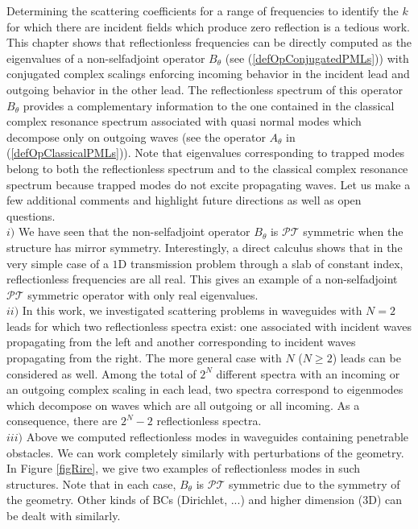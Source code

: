 \documentclass[11pt,a4paper]{report}
\newcommand{\mrm}[1]{\mathrm{#1}}
\begin{document}
\noindent Determining the scattering coefficients for a range of frequencies to identify the $k$ for which there are incident fields which produce zero reflection is a tedious work. This chapter shows that reflectionless frequencies can be directly computed as the eigenvalues of a non-selfadjoint operator $B_{\theta}$ (see (\ref{defOpConjugatedPMLs})) with conjugated complex scalings enforcing incoming behavior in the incident lead and outgoing behavior in the other lead. The reflectionless spectrum of this operator $B_{\theta}$ provides a  complementary information to the one contained in the classical complex resonance spectrum associated with quasi normal  modes which decompose only on outgoing waves (see the operator $A_\theta$ in (\ref{defOpClassicalPMLs})). Note that eigenvalues corresponding to trapped modes belong to both the reflectionless spectrum and to the classical complex resonance spectrum because trapped modes do not excite propagating waves. Let us make a few additional comments and highlight future directions as well as open questions. \\[3pt]
$i)$ We have seen that the non-selfadjoint operator $B_{\theta}$ is $\mathcal{P}\mathcal{T}$ symmetric when the structure has mirror symmetry. Interestingly, a direct calculus shows that in the very simple case of a $\mrm{1D}$ transmission problem through a slab of constant index, reflectionless frequencies are all real. This gives an example of a non-selfadjoint $\mathcal{P}\mathcal{T}$ symmetric operator with only real eigenvalues. \\[3pt]
$ii)$ In this work, we investigated scattering problems in waveguides with $N=2$ leads for which two reflectionless spectra exist: one associated with incident waves propagating from the left and another corresponding to incident waves propagating from the right. The more general case with $N$ ($N \ge 2$) leads can be considered as well. Among the total of $2^N$ different spectra with an incoming or an outgoing complex scaling in each lead, two spectra correspond to eigenmodes which decompose on waves which are all outgoing or all incoming. As a consequence, there are $2^N-2$ reflectionless spectra.\\[3pt]
$iii)$ Above we computed reflectionless modes in waveguides containing penetrable obstacles. We can work completely similarly with perturbations of the geometry. In Figure \ref{figRire}, we give two examples of reflectionless modes in such structures. Note that in each case, $B_\theta$ is $\mathcal{P}\mathcal{T}$ symmetric due to the symmetry of the geometry. Other kinds of BCs (Dirichlet, ...) 	and higher dimension ($\mrm{3D}$) can be dealt with similarly.\\
\end{document}
